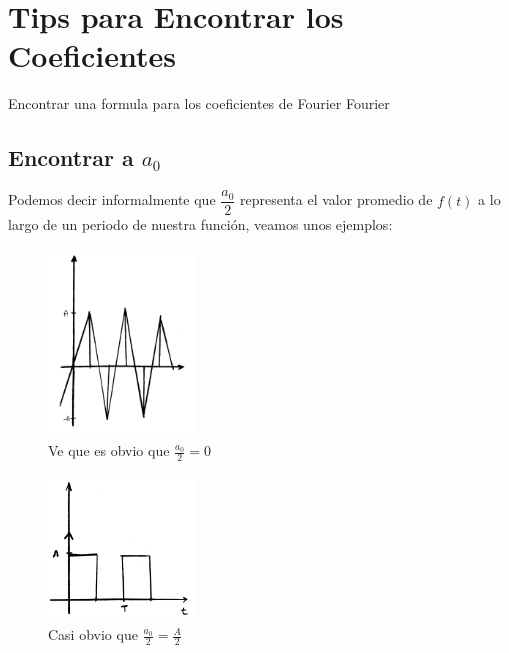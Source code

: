 \documentclass[12pt, fleqn]{report}                             %
\begin{document}
                        

        \clearpage
        \section{Tips para Encontrar los Coeficientes}

            Encontrar una formula para los coeficientes de Fourier Fourier

            \subsection{Encontrar a $a_0$}

                Podemos decir informalmente que $\dfrac{a_0}{2}$ representa el valor promedio
                de $f(t)$ a lo largo de un periodo de nuestra función, veamos unos ejemplos:

                \begin{figure}[h]
                    \centering
                    \includegraphics[width=0.35\textwidth]{SerieFourierEjemplo1}
                    \caption{Ve que es obvio que $\frac{a_0}{2}=0$}
                \end{figure}

                \begin{figure}[h]
                    \centering
                    \includegraphics[width=0.35\textwidth]{SerieFourierEjemplo2}
                    \caption{Casi obvio que $\frac{a_0}{2}=\frac{A}{2}$}
                \end{figure}
                
\end{document}
